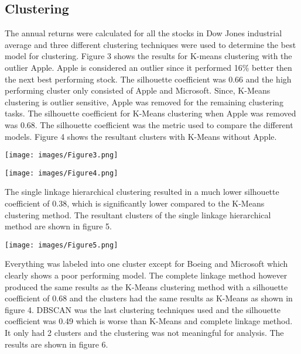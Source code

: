 \documentclass[12pt,a4paper, twoside]{article}
\begin{document}
\begin{multicols}{2}
\subsection{Clustering}
The annual returns were calculated for all the stocks in Dow Jones industrial average and three different clustering techniques were used to determine the best model for clustering. Figure 3 shows the results for K-means clustering with the outlier Apple. Apple is considered an outlier since it performed 16\% better then the next best performing stock. The silhouette coefficient was 0.66 and the high performing cluster only consisted of Apple and Microsoft. Since, K-Means clustering is outlier sensitive, Apple was removed for the remaining clustering tasks. 
\newline
\indent
The silhouette coefficient for K-Means clustering when Apple was removed was 0.68. The silhouette coefficient was the metric used to compare the different models. Figure 4 shows the resultant clusters with K-Means without Apple. 

\begin{center}
        \texttt{[image: images/Figure3.png]}
    \end{center}
    
    \begin{center}
        \texttt{[image: images/Figure4.png]}
    \end{center}

The single linkage hierarchical clustering resulted in a much lower silhouette coefficient of 0.38, which is significantly lower compared to the K-Means clustering method. The resultant clusters of the single linkage hierarchical method are shown in figure 5.
 
    \begin{center}
        \texttt{[image: images/Figure5.png]}
    \end{center}
 
Everything was labeled into one cluster except for Boeing and Microsoft which clearly shows a poor performing model. The complete linkage method however produced the same results as the K-Means clustering method with a silhouette coefficient of 0.68 and the clusters had the same results as K-Means as shown in figure 4. DBSCAN was the last clustering techniques used and the silhouette coefficient was 0.49 which is worse than K-Means and complete linkage method. It only had 2 clusters and the clustering was not meaningful for analysis. The results are shown in figure 6.
 

\end{multicols}
\end{document}
